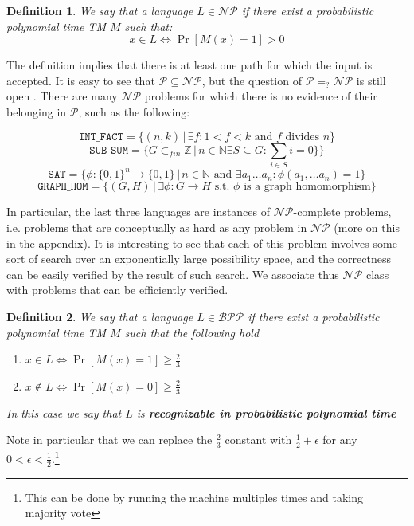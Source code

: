 \documentclass{article}
\newtheorem{definition}{Definition}
\begin{document}
\begin{definition}
We say that a language $L \in \mathcal{NP}$ if there exist a probabilistic polynomial time TM $M$ such that:
\[x \in L \iff \Pr[M(x) = 1] > 0\]
\end{definition}

The definition implies that there is at least one path for which the input is accepted. It is easy to see that $\mathcal{P} \subseteq \mathcal{NP}$, but the question of $\mathcal{P} =_? \mathcal{NP}$ is still open \cite{cookComplexityTheoremprovingProcedures1971} \cite{jaffeMillenniumGrandChallenge2006}. There are many $\mathcal{NP}$ problems for which there is no evidence of their belonging in $\mathcal{P}$, such as the following:

\[ \texttt{INT\_FACT} = \{ (n, k) \, | \, \exists f : 1 < f < k \text { and } f \text{ divides } n\}\]
\[ \texttt{SUB\_SUM} = \{ G \subset_{fin} \mathbb{Z} \, | \, n \in \mathbb{N} \exists S \subseteq G : \sum_{i \in S} i = 0  \} \}\]
\[ \texttt{SAT} = \{ \phi : \{0,1\}^n \to \{0,1\} \, | \, n \in \mathbb{N} \text{ and } \exists a_1 \dots a_n : \phi(a_1, \dots a_n) = 1 \} \]
\[ \texttt{GRAPH\_HOM} = \{ (G, H) \, | \, \exists \phi : G \to H \text{ s.t. $\phi$ is a graph homomorphism} \}\]

In particular, the last three languages are instances of $\mathcal{NP}$-complete problems, i.e. problems that are conceptually as hard as any problem in $\mathcal{NP}$ (more on this in the appendix). It is interesting to see that each of this problem involves some sort of search over an exponentially large possibility space, and the correctness can be easily verified by the result of such search. We associate thus $\mathcal{NP}$ class with problems that can be efficiently verified.

\begin{definition}
We say that a language $L \in \mathcal{BPP}$ if there exist a probabilistic polynomial time TM $M$ such that the following hold
\begin{enumerate}
    \item $x \in L \iff \Pr[M(x) = 1] \geq \frac{2}{3}$
    \item $x \notin L \iff \Pr[M(x) = 0] \geq \frac{2}{3}$
\end{enumerate}
In this case we say that $L$ is \textbf{recognizable in probabilistic polynomial time}
\end{definition}

Note in particular that we can replace the $\frac{2}{3}$ constant with $\frac{1}{2} + \epsilon$ for any $0 < \epsilon < \frac{1}{2}.$\footnote{This can be done by running the machine multiples times and taking majority vote}
\end{document}
